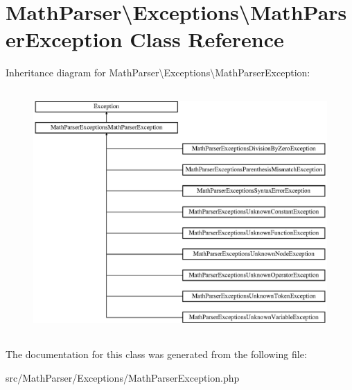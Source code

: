 \hypertarget{classMathParser_1_1Exceptions_1_1MathParserException}{\section{Math\-Parser\textbackslash{}Exceptions\textbackslash{}Math\-Parser\-Exception Class Reference}
\label{classMathParser_1_1Exceptions_1_1MathParserException}
}
Inheritance diagram for Math\-Parser\textbackslash{}Exceptions\textbackslash{}Math\-Parser\-Exception\-:\begin{figure}[H]
\begin{center}
\leavevmode
\includegraphics[height=9.361702cm]{classMathParser_1_1Exceptions_1_1MathParserException}
\end{center}
\end{figure}


The documentation for this class was generated from the following file\-:\begin{DoxyCompactItemize}
\item 
src/\-Math\-Parser/\-Exceptions/Math\-Parser\-Exception.\-php\end{DoxyCompactItemize}

